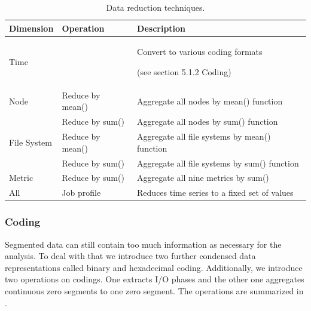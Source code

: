 \documentclass[]{llncs}
\begin{document}
\begin{table}
	\centering
	\begin{tabularx}{\textwidth}{llX}
		\hline
		Dimension       & Operation                                    &  Description                                                       \\ 
		\hline
		Time            &                                              &  Convert to various coding formats \par (see section 5.1.2 Coding) \\ 
		\hline
		Node            & Reduce by mean()                             &  Aggregate all nodes by mean() function                            \\ 
		\hline
		                & Reduce by sum()                              &  Aggregate all nodes by sum() function                             \\ 
		\hline
		File System     & Reduce by mean()                             &  Aggregate all file systems by mean() function                     \\ 
		\hline
		                & 
		Reduce by sum() & Aggregate all file systems by sum() function \\ 
		\hline
		Metric          & Reduce by sum()                              &  Aggregate all nine metrics by sum()                               \\ 
		\hline
		All             & Job profile                                  &  Reduces time series to a fixed set of values                      \\ 
		\hline
	\end{tabularx}
	\caption{Data reduction techniques.}
	\label{tab:reduction_techniques}
\end{table}


\subsubsection{Coding}
Segmented data can still contain too much information as necessary for the analysis.
To deal with that we introduce two further condensed data representations called binary and hexadecimal coding.
Additionally, we introduce two operations on codings.
One extracts I/O phases and the other one aggregates continuous zero segments to one zero segment.
The operations are summarized in .
\end{document}
